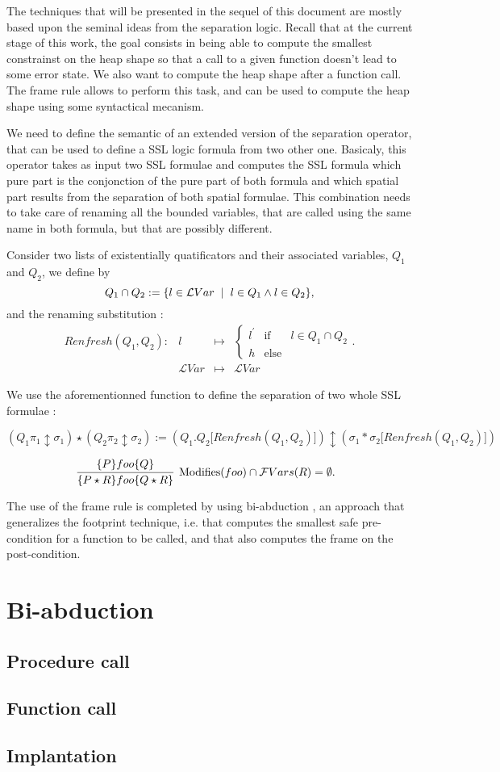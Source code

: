 \documentclass[a4paper,twoside,12pt]{report}
\newcommand{\defeq}[0]{:=}
\newcommand\LVar{\mathcal{L}Var} %
\newcommand{\Unsep}[0]{\ast}
\newcommand{\Sep}[2]{#1 \Unsep #2}
\newcommand{\Sepf}[2]{ #1 \star #2}
\newcommand{\Formula}[2]{ #1  \updownarrow #2}
\newcommand{\FVars}[1]{\mathcal{F}Vars(#1)}
\newcommand{\fundec}[5]{\begin{array}{llll} {#1}:&{#2} &\mapsto & {#3} \\ &{#4} & \mapsto& #5  \end{array}}
\newcommand{\renfresh}[2]{Renfresh(#1,#2)}
\begin{document}
The techniques that will be presented in the sequel of this document
are mostly based upon the seminal ideas from the separation logic. 
Recall that at the current stage of this work, the goal consists in
being able to compute the smallest constrainst on the heap shape
so that a call to a given function doesn't lead to some error state.
We also want to compute the heap shape after a function  call. 
The frame rule allows to  perform this task, and can be used to
compute the heap shape using some syntactical mecanism.

We need to define the semantic of an extended version of the separation
operator, that can be used to define a SSL logic formula from two other
one. Basicaly, this operator takes as input two SSL formulae and
computes the SSL formula which pure part is the conjonction of the pure part
of both formula and which spatial part results from the separation
of both spatial formulae. This combination needs to take care of renaming
all the bounded variables, that are called using the same name in both
formula, but that are possibly different.

Consider two lists of existentially quatificators and their 
associated variables, $Q_1$ and $Q_2$,  we define by 
$$
Q_1 \cap Q_2 \defeq \lbrace l \in \LVar \gspace | \gspace l \in Q_1 \land l \in Q_2 \rbrace,
$$
and the renaming substitution :
$$
\fundec{\renfresh{Q_1}{Q_2}}{l}{
	\left \lbrace \begin{array}{lll} l^{\prime} &\mbox{if }& l \in Q_1 \cap Q_2 \\ 
h
 &\mbox{else}& 
	\end{array} \right . .}{\LVar}{\LVar} 
$$

We use the aforementionned function to define the separation of two whole SSL formulae :

$$
\Sepf{(\Formula{Q_1 \pi_1}{\sigma_1})}{(\Formula{Q_2 \pi_2}{\sigma_2})} := \Formula{(Q_1.Q_2\lbrack \renfresh{Q_1}{Q_2}\rbrack)}{(\Sep{\sigma_1}{\sigma_2\lbrack \renfresh{Q_1}{Q_2}\rbrack})}
$$ 

$$
\infer[\mbox{Modifies}(foo) \cap \FVars{R}=\emptyset.
]{\lbrace \Sepf{P}{R} \rbrace foo \lbrace \Sepf{Q}{R}\rbrace}{\lbrace P \rbrace foo \lbrace Q\rbrace} \gspace $$


The use of the frame rule is completed by using bi-abduction \cite{BiAbduction09}, an approach that generalizes the footprint technique, i.e. that computes the
smallest safe pre-condition for a function to be called, and that also computes
the frame on the post-condition.

\section{Bi-abduction}


\subsection{Procedure call}

\subsection{Function call}

\subsection{Implantation} 




\end{document}
